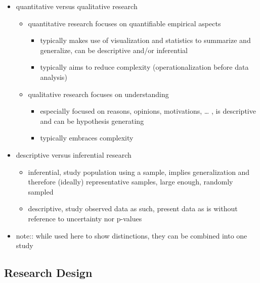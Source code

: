 \documentclass[]{article}
\providecommand{\tightlist}{%
  \setlength{\itemsep}{0pt}\setlength{\parskip}{0pt}}
\begin{document}
\begin{itemize}
\tightlist
\item
  quantitative versus qualitative research

  \begin{itemize}
  \tightlist
  \item
    quantitative research focuses on quantifiable empirical aspects

    \begin{itemize}
    \tightlist
    \item
      typically makes use of visualization and statistics to summarize
      and generalize, can be descriptive and/or inferential
    \item
      typically aims to reduce complexity (operationalization before
      data analysis)
    \end{itemize}
  \item
    qualitative research focuses on understanding

    \begin{itemize}
    \tightlist
    \item
      especially focused on reasons, opinions, motivations, \ldots{} ,
      is descriptive and can be hypothesis generating
    \item
      typically embraces complexity 
    \end{itemize}
  \end{itemize}
\item
  descriptive versus inferential research

  \begin{itemize}
  \tightlist
  \item
    inferential, study population using a sample, implies generalization
    and therefore (ideally) representative samples, large enough,
    randomly sampled
  \item
    descriptive, study observed data as such, present data as is without
    reference to uncertainty nor p-values 
  \end{itemize}
\item
  note:: while used here to show distinctions, they can be combined into
  one study
\end{itemize}

\newpage

\subsection{Research Design}\label{research-design}
\end{document}
